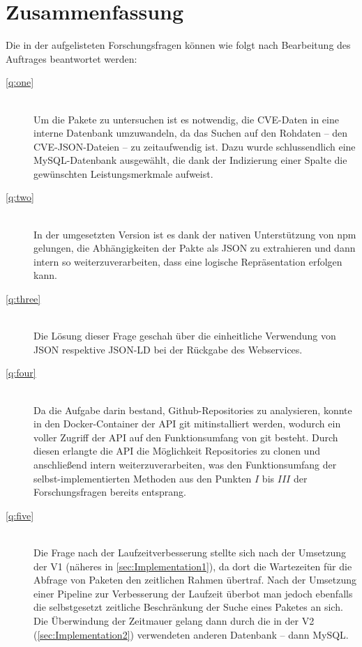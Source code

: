 \section{Zusammenfassung} \label{sec:Zusammenfassung}
    Die in der  aufgelisteten Forschungsfragen können wie folgt nach Bearbeitung des Auftrages beantwortet werden:
    \begin{description}
        \item[\ref{q:one}]\hfill \\
            Um die Pakete zu untersuchen ist es notwendig, die \ac{CVE}-Daten in eine interne Datenbank umzuwandeln, da das Suchen auf den Rohdaten -- den \ac{CVE}-\ac{JSON}-Dateien -- zu zeitaufwendig ist.
            Dazu wurde schlussendlich eine MySQL-Datenbank ausgewählt, die dank der Indizierung einer Spalte die gewünschten Leistungsmerkmale aufweist.
        \item[\ref{q:two}]\hfill \\
            In der umgesetzten Version ist es dank der nativen Unterstützung von npm gelungen, die Abhängigkeiten der Pakte als \ac{JSON} zu extrahieren und dann intern so weiterzuverarbeiten, dass eine logische Repräsentation erfolgen kann.
        \item[\ref{q:three}]\hfill \\
            Die Lösung dieser Frage geschah über die einheitliche Verwendung von \ac{JSON} respektive \ac{JSON-LD} bei der Rückgabe des Webservices.
        \item[\ref{q:four}]\hfill \\
            Da die Aufgabe darin bestand, Github-Repositories zu analysieren, konnte in den Docker-Container der \ac{API} git mitinstalliert werden, wodurch ein voller Zugriff der \ac{API} auf den Funktionsumfang von git besteht.
            Durch diesen erlangte die \ac{API} die Möglichkeit Repositories zu clonen und anschließend intern weiterzuverarbeiten, was den Funktionsumfang der selbst-implementierten Methoden aus den Punkten $I$ bis $III$ der Forschungsfragen bereits entsprang.
        \item[\ref{q:five}]\hfill \\
            Die Frage nach der Laufzeitverbesserung stellte sich nach der Umsetzung der V1 (näheres in \ref{sec:Implementation1}), da dort die Wartezeiten für die Abfrage von Paketen den zeitlichen Rahmen übertraf.
            Nach der Umsetzung einer Pipeline zur Verbesserung der Laufzeit überbot man jedoch ebenfalls die selbstgesetzt zeitliche Beschränkung der Suche eines Paketes an sich.
            \\
            Die Überwindung der Zeitmauer gelang dann durch die in der V2 (\ref{sec:Implementation2}) verwendeten anderen Datenbank -- dann MySQL.
    \end{description}
